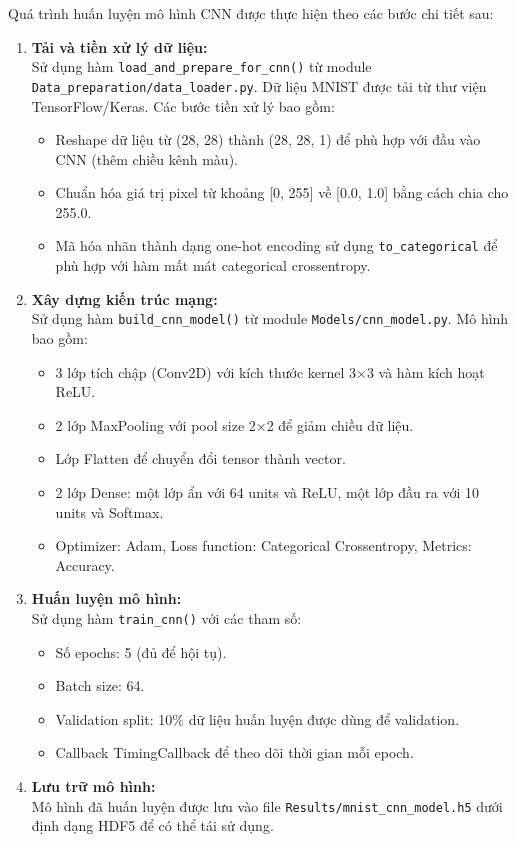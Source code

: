 \documentclass[../DoAn.tex]{subfiles}
\begin{document}
Quá trình huấn luyện mô hình CNN được thực hiện theo các bước chi tiết sau:

\begin{enumerate}
    \item \textbf{Tải và tiền xử lý dữ liệu:} \\Sử dụng hàm \texttt{load\_and\_prepare\_for\_cnn()} từ module \texttt{Data\_preparation/data\_loader.py}. Dữ liệu MNIST được tải từ thư viện TensorFlow/Keras. Các bước tiền xử lý bao gồm:
    \begin{itemize}
        \item Reshape dữ liệu từ (28, 28) thành (28, 28, 1) để phù hợp với đầu vào CNN (thêm chiều kênh màu).
        \item Chuẩn hóa giá trị pixel từ khoảng [0, 255] về [0.0, 1.0] bằng cách chia cho 255.0.
        \item Mã hóa nhãn thành dạng one-hot encoding sử dụng \texttt{to\_categorical} để phù hợp với hàm mất mát categorical crossentropy.
    \end{itemize}
    
    \item \textbf{Xây dựng kiến trúc mạng:} \\Sử dụng hàm \texttt{build\_cnn\_model()} từ module \texttt{Models/cnn\_model.py}. Mô hình bao gồm:
    \begin{itemize}
        \item 3 lớp tích chập (Conv2D) với kích thước kernel 3×3 và hàm kích hoạt ReLU.
        \item 2 lớp MaxPooling với pool size 2×2 để giảm chiều dữ liệu.
        \item Lớp Flatten để chuyển đổi tensor thành vector.
        \item 2 lớp Dense: một lớp ẩn với 64 units và ReLU, một lớp đầu ra với 10 units và Softmax.
        \item Optimizer: Adam, Loss function: Categorical Crossentropy, Metrics: Accuracy.
    \end{itemize}
    
    \item \textbf{Huấn luyện mô hình:} \\Sử dụng hàm \texttt{train\_cnn()} với các tham số:
    \begin{itemize}
        \item Số epochs: 5 (đủ để hội tụ).
        \item Batch size: 64.
        \item Validation split: 10\% dữ liệu huấn luyện được dùng để validation.
        \item Callback TimingCallback để theo dõi thời gian mỗi epoch.
    \end{itemize}
    
    \item \textbf{Lưu trữ mô hình:} \\Mô hình đã huấn luyện được lưu vào file \texttt{Results/mnist\_cnn\_model.h5} dưới định dạng HDF5 để có thể tái sử dụng.
    
\end{enumerate}
\\
\end{document}
